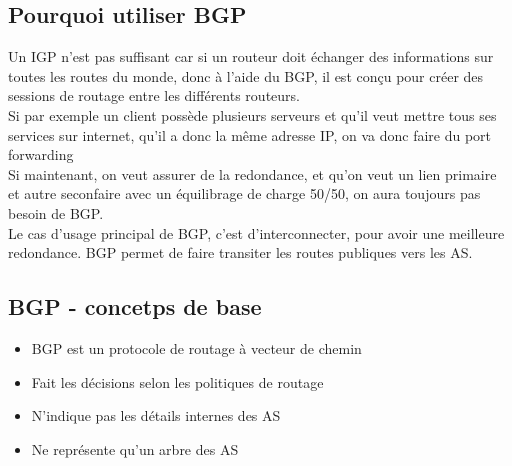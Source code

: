 \documentclass[12pt, a4paper]{article}
\begin{document}
\subsection{Pourquoi utiliser BGP}
    Un IGP n'est pas suffisant car si un routeur doit échanger des informations
    sur toutes les routes du monde, donc à l'aide du BGP, il est conçu pour
    créer des sessions de routage entre les différents routeurs.\\

    Si par exemple un client possède plusieurs serveurs et qu'il veut mettre 
    tous ses services sur internet, qu'il a donc la même adresse IP, on va 
    donc faire du port forwarding\\

    Si maintenant, on veut assurer de la redondance, et qu'on veut un lien
    primaire et autre seconfaire avec un équilibrage de charge 50/50, on aura
    toujours pas besoin de BGP. \\
    
    Le cas d'usage principal de BGP, c'est d'interconnecter, pour avoir une meilleure
    redondance. 
    BGP permet de faire transiter les routes publiques vers les AS.
    \newpage

    \subsection{BGP - concetps de base}
    \begin{itemize}
        \item BGP est un protocole de routage à vecteur de chemin
        \item Fait les décisions selon les politiques de routage
        \item N'indique pas les détails internes des AS
        \item Ne représente qu'un arbre des AS
        
    \end{itemize}
\end{document}
